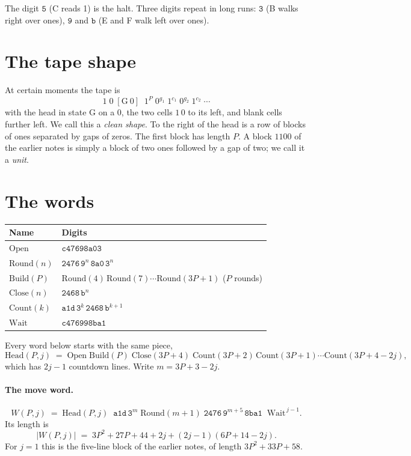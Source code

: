 \documentclass[11pt]{article}
\theoremstyle{remark}
\newcommand{\w}[1]{\mathtt{#1}}
\newcommand{\nm}[1]{\mathrm{#1}}
\begin{document}
\noindent The digit $\w5$ (C reads 1) is the halt. Three digits repeat in long
runs: $\w3$ (B walks right over ones), $\w9$ and $\w{b}$ (E and F walk left
over ones).

\section{The tape shape}

At certain moments the tape is
\[
1\;0\;[\mathrm{G}\ 0]\;\; 1^{P}\; 0^{g_1}\; 1^{c_1}\; 0^{g_2}\; 1^{c_2}\;\cdots
\]
with the head in state G on a $0$, the two cells $1\,0$ to its left, and
blank cells further left. We call this a \emph{clean shape}. To the right of
the head is a row of blocks of ones separated by gaps of zeros. The first block
has length $P$. A block $1100$ of the earlier notes is simply a block of two
ones followed by a gap of two; we call it a \emph{unit}.

\section{The words}

\begin{center}
\renewcommand{\arraystretch}{1.2}
\begin{tabular}{@{}ll@{}}
\toprule
Name & Digits\\
\midrule
$\nm{Open}$ & $\w{c47698a03}$\\
$\nm{Round}(n)$ & $\w{2476}\,\w9^{n}\,\w{8a0}\,\w3^{n}$\\
$\nm{Build}(P)$ & $\nm{Round}(4)\,\nm{Round}(7)\cdots\nm{Round}(3P+1)$ \quad ($P$ rounds)\\
$\nm{Close}(n)$ & $\w{2468}\,\w{b}^{n}$\\
$\nm{Count}(k)$ & $\w{a1d}\,\w3^{k}\,\w{2468}\,\w{b}^{k+1}$\\
$\nm{Wait}$ & $\w{c476998ba1}$\\
\bottomrule
\end{tabular}
\end{center}

\noindent Every word below starts with the same piece,
\[
\nm{Head}(P,j) \;=\; \nm{Open}\;\nm{Build}(P)\;\nm{Close}(3P+4)\;
\nm{Count}(3P+2)\,\nm{Count}(3P+1)\cdots\nm{Count}(3P+4-2j),
\]
which has $2j-1$ countdown lines. Write $m = 3P+3-2j$.

\paragraph{The move word.}
\[
W(P,j) \;=\; \nm{Head}(P,j)\;\;\w{a1d}\,\w3^{m}\;\nm{Round}(m+1)\;
\w{2476}\,\w9^{m+5}\,\w{8ba1}\;\;\nm{Wait}^{\,j-1}.
\]
Its length is
\[
|W(P,j)| \;=\; 3P^{2}+27P+44+2j+(2j-1)(6P+14-2j).
\]
For $j=1$ this is the five-line block of the earlier notes, of length
$3P^{2}+33P+58$.
\end{document}
